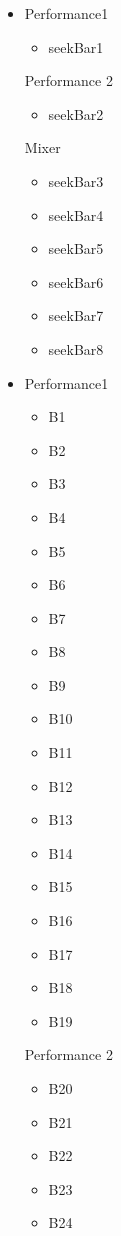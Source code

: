 \documentclass[11pt]{article}
\begin{document}
\begin{itemize}
\item Performance1
\begin{itemize}
\item seekBar1
\end{itemize}
Performance 2
\begin{itemize}
\item seekBar2
\end{itemize}
Mixer
\begin{itemize}
\item seekBar3
\item seekBar4
\item seekBar5
\item seekBar6
\item seekBar7
\item seekBar8
\end{itemize}
\end{itemize}

\begin{itemize}
\item Performance1
\begin{itemize}
\item B1
\item B2
\item B3
\item B4
\item B5
\item B6
\item B7
\item B8
\item B9
\item B10
\item B11
\item B12
\item B13
\item B14
\item B15
\item B16
\item B17
\item B18
\item B19
\end{itemize}
Performance 2
\begin{itemize}
\item B20
\item B21
\item B22
\item B23
\item B24
\end{itemize}
\end{itemize}
\end{document}
